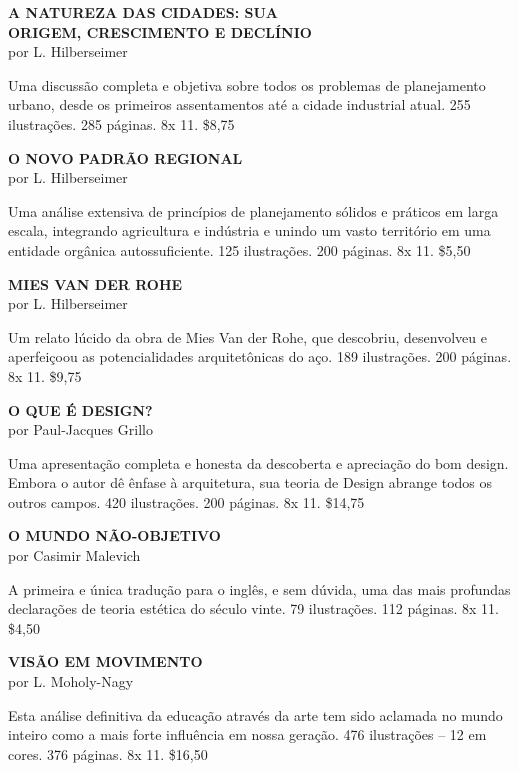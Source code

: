 \documentclass[a4paper]{article}
\begin{document}
\bigskip

\textbf{A NATUREZA DAS CIDADES: SUA} \\
\textbf{ORIGEM, CRESCIMENTO E DECLÍNIO} \\
por L. Hilberseimer

Uma discussão completa e objetiva sobre todos os problemas de planejamento urbano, desde os primeiros assentamentos até a cidade industrial atual. 255 ilustrações. 285 páginas. 8\textonehalf x 11.
\hfill \$8,75

\bigskip

\textbf{O NOVO PADRÃO REGIONAL} \\
por L. Hilberseimer

Uma análise extensiva de princípios de planejamento sólidos e práticos em larga escala, integrando agricultura e indústria e unindo um vasto território em uma entidade orgânica autossuficiente. 125 ilustrações. 200 páginas. 8\textonehalf x 11.
\hfill \$5,50

\bigskip

\textbf{MIES VAN DER ROHE} \\
por L. Hilberseimer

Um relato lúcido da obra de Mies Van der Rohe, que descobriu, desenvolveu e aperfeiçoou as potencialidades arquitetônicas do aço. 189 ilustrações. 200 páginas. 8\textonehalf x 11.
\hfill \$9,75

\bigskip

\textbf{O QUE É DESIGN?} \\
por Paul-Jacques Grillo

Uma apresentação completa e honesta da descoberta e apreciação do bom design. Embora o autor dê ênfase à arquitetura, sua teoria de Design abrange todos os outros campos. 420 ilustrações. 200 páginas. 8\textonehalf x 11.
\hfill \$14,75

\bigskip\bigskip\bigskip

\textbf{O MUNDO NÃO-OBJETIVO} \\
por Casimir Malevich

A primeira e única tradução para o inglês, e sem dúvida, uma das mais profundas declarações de teoria estética do século vinte. 79 ilustrações. 112 páginas. 8\textonehalf x 11.
\hfill \$4,50

\bigskip

\textbf{VISÃO EM MOVIMENTO} \\
por L. Moholy-Nagy

Esta análise definitiva da educação através da arte tem sido aclamada no mundo inteiro como a mais forte influência em nossa geração. 476 ilustrações -- 12 em cores. 376 páginas. 8\textonehalf x 11.
\hfill \$16,50
\end{document}
